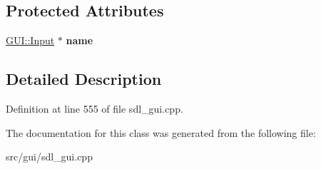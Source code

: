 \subsection*{Protected Attributes}
\begin{DoxyCompactItemize}
\item 
\hypertarget{classSaveDialog_a112cebb10bd8304b2eaf491beded0abb}{\hyperlink{classGUI_1_1Input}{G\-U\-I\-::\-Input} $\ast$ {\bfseries name}}\label{classSaveDialog_a112cebb10bd8304b2eaf491beded0abb}

\end{DoxyCompactItemize}


\subsection{Detailed Description}


Definition at line 555 of file sdl\-\_\-gui.\-cpp.



The documentation for this class was generated from the following file\-:\begin{DoxyCompactItemize}
\item 
src/gui/sdl\-\_\-gui.\-cpp\end{DoxyCompactItemize}
